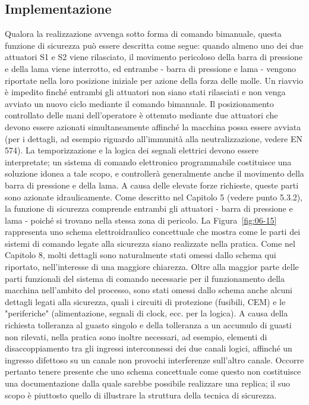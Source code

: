 \subsection{Implementazione}
\label{subsec:06-5-2}
Qualora la realizzazione avvenga sotto forma di comando bimanuale, questa funzione di sicurezza può essere descritta come segue: quando almeno uno dei due attuatori S1 e S2 viene rilasciato, il movimento pericoloso della barra di pressione e della lama viene interrotto, ed entrambe - barra di pressione e lama - vengono riportate nella loro posizione iniziale per azione della forza delle molle. Un riavvio è impedito finché entrambi gli attuatori non siano stati rilasciati e non venga avviato un nuovo ciclo mediante il comando bimanuale. Il posizionamento controllato delle mani dell'operatore è ottenuto mediante due attuatori che devono essere azionati simultaneamente affinché la macchina possa essere avviata (per i dettagli, ad esempio riguardo all'immunità alla neutralizzazione, vedere EN 574). La temporizzazione e la logica dei segnali elettrici devono essere interpretate; un sistema di comando elettronico programmabile costituisce una soluzione idonea a tale scopo, e controllerà generalmente anche il movimento della barra di pressione e della lama. A causa delle elevate forze richieste, queste parti sono azionate idraulicamente. Come descritto nel Capitolo 5 (vedere punto 5.3.2), la funzione di sicurezza comprende entrambi gli attuatori - barra di pressione e lama - poiché si trovano nella stessa zona di pericolo. La Figura~\ref{fig:06-15} rappresenta uno schema elettroidraulico concettuale che mostra come le parti dei sistemi di comando legate alla sicurezza siano realizzate nella pratica. Come nel Capitolo 8, molti dettagli sono naturalmente stati omessi dallo schema qui riportato, nell'interesse di una maggiore chiarezza. Oltre alla maggior parte delle parti funzionali del sistema di comando necessarie per il funzionamento della macchina nell'ambito del processo, sono stati omessi dallo schema anche alcuni dettagli legati alla sicurezza, quali i circuiti di protezione (fusibili, CEM) e le "periferiche" (alimentazione, segnali di clock, ecc. per la logica). A causa della richiesta tolleranza al guasto singolo e della tolleranza a un accumulo di guasti non rilevati, nella pratica sono inoltre necessari, ad esempio, elementi di disaccoppiamento tra gli ingressi interconnessi dei due canali logici, affinché un ingresso difettoso su un canale non provochi interferenze sull'altro canale. Occorre pertanto tenere presente che uno schema concettuale come questo non costituisce una documentazione dalla quale sarebbe possibile realizzare una replica; il suo scopo è piuttosto quello di illustrare la struttura della tecnica di sicurezza.

